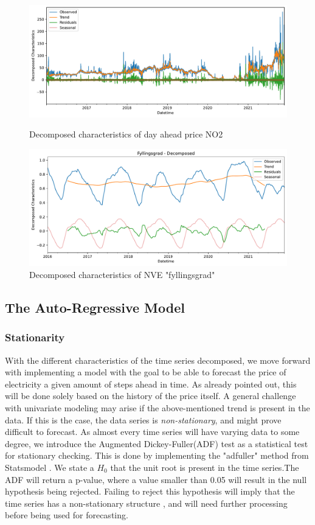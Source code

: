 \documentclass
[twocolumn,
secnumarabic,
nobibnotes,
aps,
prl,
reprint,
groupedaddress,
amsmath,
amssymb,
]{revtex4-2}
\begin{document}
\begin{figure}
  \includegraphics[width=2.1\columnwidth]{figures/decomposed_characteristics.pdf}
  \caption{\label{fig:decomposed_characteristics} Decomposed characteristics of day ahead price NO2}
  \includegraphics[width=2.1\columnwidth]{figures/NVE_decomposed_characteristics.pdf}
  \caption{\label{fig:NVE_decomposed_characteristics} Decomposed characteristics of NVE "fyllingsgrad"}
\end{figure}



\subsection{The Auto-Regressive Model}

\subsubsection{Stationarity}
With the different characteristics of the time series decomposed, we move forward with implementing a model with the goal to be able to forecast the price of electricity a given amount of steps ahead in time. As already pointed out, this will be done solely based on the history of the price itself. A general challenge with univariate modeling may arise if the above-mentioned trend is present in the data. If this is the case, the data series is \emph{non-stationary}, and might prove difficult to forecast. As almost every time series will have varying data to some degree, we introduce the Augmented Dickey-Fuller(ADF) test as a statistical test for stationary checking. This is done by implementing the "adfuller" method from Statsmodel \cite{seabold2010statsmodels}. We state a $H_0$ that the unit root is present in the time series.The ADF will return a p-value, where a value smaller than 0.05 will result in the null hypothesis being rejected. Failing to reject this hypothesis will imply that the time series has a non-stationary structure \cite{Vishwas2020}, and will need further processing before being used for forecasting.  
\end{document}

